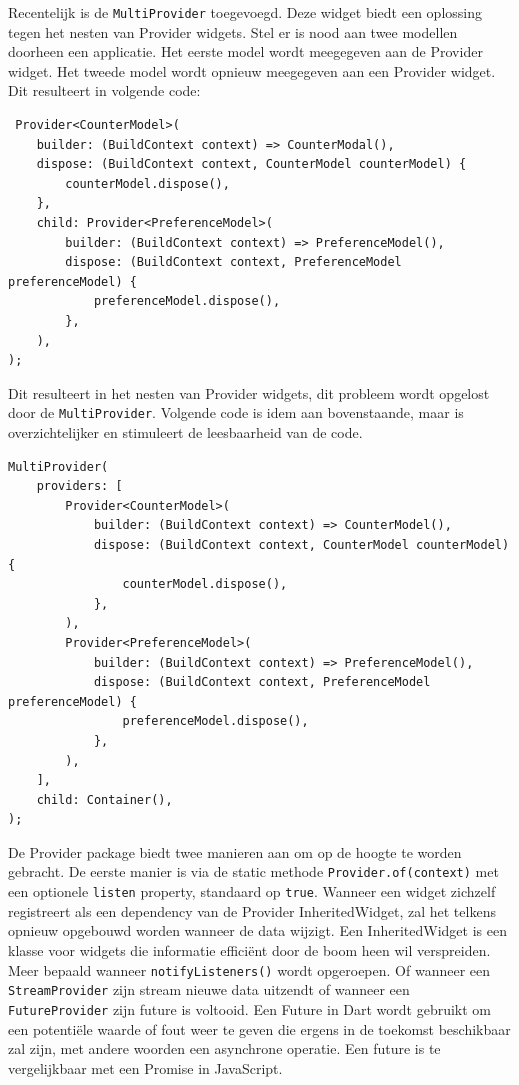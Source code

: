 Recentelijk is de \verb|MultiProvider| toegevoegd. Deze widget biedt een oplossing tegen het nesten van Provider widgets. Stel er is nood aan twee modellen doorheen een applicatie. Het eerste model wordt meegegeven aan de Provider widget. Het tweede model wordt opnieuw meegegeven aan een Provider widget. Dit resulteert in volgende code:
 \begin{verbatim}
 Provider<CounterModel>(
    builder: (BuildContext context) => CounterModal(),
    dispose: (BuildContext context, CounterModel counterModel) {
        counterModel.dispose(),
    },
    child: Provider<PreferenceModel>(
        builder: (BuildContext context) => PreferenceModel(),
        dispose: (BuildContext context, PreferenceModel preferenceModel) {
            preferenceModel.dispose(),
        },
    ),
);
\end{verbatim}
Dit resulteert in het nesten van Provider widgets, dit probleem wordt opgelost door de \verb|MultiProvider|. Volgende code is idem aan bovenstaande, maar is overzichtelijker en stimuleert de leesbaarheid van de code.
 \begin{verbatim}
MultiProvider(
    providers: [
        Provider<CounterModel>(
            builder: (BuildContext context) => CounterModel(),
            dispose: (BuildContext context, CounterModel counterModel) {
                counterModel.dispose(),
            },
        ),
        Provider<PreferenceModel>(
            builder: (BuildContext context) => PreferenceModel(),
            dispose: (BuildContext context, PreferenceModel preferenceModel) {
                preferenceModel.dispose(),
            },
        ),
    ],
    child: Container(),
);

\end{verbatim}

De Provider package biedt twee manieren aan om op de hoogte te worden gebracht.
\newline
De eerste manier is via de static methode \verb|Provider.of(context)| met een optionele \verb|listen| property, standaard op \verb|true|.
Wanneer een widget zichzelf registreert als een dependency van de Provider InheritedWidget, zal het telkens opnieuw opgebouwd worden wanneer de data wijzigt. Een InheritedWidget is een klasse voor widgets die informatie efficiënt door de boom heen wil verspreiden.
 Meer bepaald wanneer \verb|notifyListeners()| wordt opgeroepen. Of wanneer een \verb|StreamProvider| zijn stream nieuwe data uitzendt of wanneer een \verb|FutureProvider| zijn future is voltooid. Een Future in Dart wordt gebruikt om een potentiële waarde of fout weer te geven die ergens in de toekomst beschikbaar zal zijn, met andere woorden een asynchrone operatie. Een future is te vergelijkbaar met een Promise in JavaScript.

